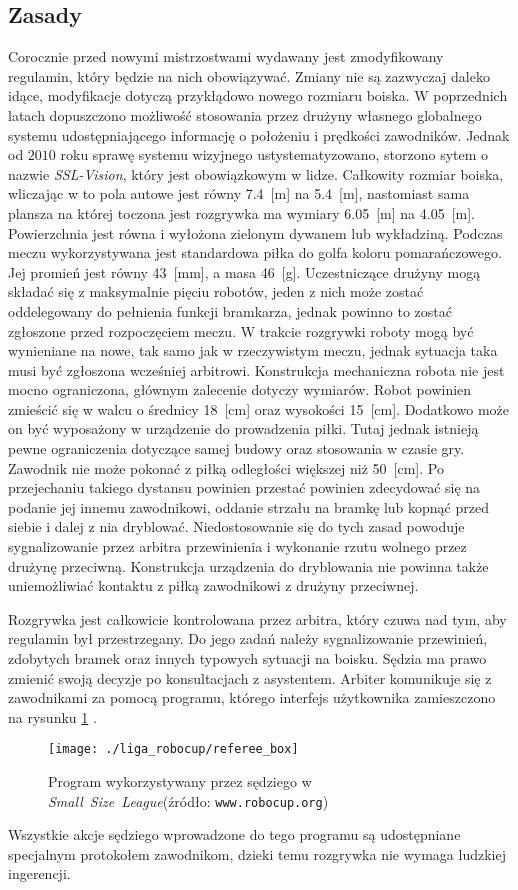 	\subsection{Zasady}
	Corocznie przed nowymi mistrzostwami wydawany jest zmodyfikowany regulamin, który będzie na nich obowiązywać. Zmiany nie są zazwyczaj daleko idące, modyfikacje dotyczą przykłądowo nowego rozmiaru boiska.
	W poprzednich latach dopuszczono możliwość stosowania przez drużyny własnego globalnego systemu udostępniającego informację o położeniu i prędkości zawodników.
	Jednak od $2010$ roku sprawę systemu wizyjnego ustystematyzowano, storzono sytem o nazwie \textit{SSL-Vision}, który jest obowiązkowym w lidze. 
	Całkowity rozmiar boiska, wliczając w to pola autowe jest równy 7.4~[m] na 5.4~[m], nastomiast sama plansza na której toczona jest rozgrywka ma wymiary 6.05~[m] na 4.05~[m].
	Powierzchnia jest równa i  wyłożona zielonym dywanem lub wykładziną. Podczas meczu wykorzystywana jest standardowa piłka do golfa koloru pomarańczowego. Jej promień jest równy 43~[mm], a masa
	46~[g].
	Uczestniczące drużyny mogą składać się z maksymalnie pięciu robotów, jeden z nich może zostać oddelegowany do pełnienia
	funkcji bramkarza, jednak powinno to zostać zgłoszone przed rozpoczęciem meczu. W trakcie rozgrywki roboty mogą być wynieniane na nowe, tak samo jak w rzeczywistym meczu, jednak 
	sytuacja taka musi być zgłoszona wcześniej arbitrowi.
	Konstrukcja mechaniczna robota nie jest mocno ograniczona, głównym zalecenie dotyczy wymiarów. Robot powinien zmieścić się w walcu o średnicy 18~[cm] oraz wysokości 15~[cm].
	Dodatkowo może on być wyposażony w urządzenie do prowadzenia piłki. Tutaj jednak istnieją pewne ograniczenia dotyczące
	samej budowy oraz stosowania w czasie gry. Zawodnik nie może pokonać z piłką odległości większej niż 50~[cm]. Po przejechaniu takiego dystansu powinien przestać powinien zdecydować się
	na podanie jej innemu zawodnikowi, oddanie strzału na bramkę lub kopnąć przed siebie i dalej z nia dryblować. Niedostosowanie się do tych zasad powoduje sygnalizowanie przez arbitra
	przewinienia i wykonanie rzutu wolnego przez drużynę przeciwną. Konstrukcja urządzenia do dryblowania nie powinna także uniemożliwiać kontaktu z piłką zawodnikowi z drużyny przeciwnej.
		
	Rozgrywka jest całkowicie kontrolowana przez arbitra, który czuwa nad tym, aby  regulamin był przestrzegany. Do
	jego zadań należy sygnalizowanie przewinień, zdobytych bramek oraz innych typowych sytuacji na boisku.
	Sędzia ma prawo zmienić swoją decyzje po konsultacjach z asystentem. Arbiter komunikuje się z zawodnikami za pomocą programu, którego interfejs użytkownika zamieszczono na rysunku \ref{fig:referee_box} .
	\begin{figure}[H]
	\centering
	\texttt{[image: ./liga\_robocup/referee\_box]}
	\caption{Program wykorzystywany przez sędziego w  \mbox{\emph{Small Size League}}\newline(źródło: \texttt{www.robocup.org}) }
	\label{fig:referee_box}
	\end{figure} 
	Wszystkie akcje sędziego wprowadzone do tego programu są udostępniane specjalnym protokołem zawodnikom, dzieki temu rozgrywka nie wymaga ludzkiej ingerencji.
